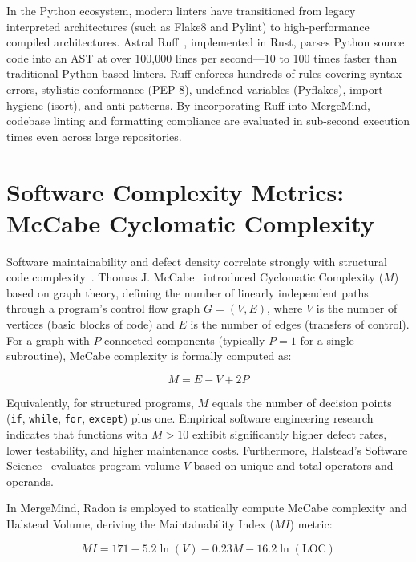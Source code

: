 In the Python ecosystem, modern linters have transitioned from legacy interpreted architectures (such as Flake8 and Pylint) to high-performance compiled architectures. Astral Ruff~\cite{astral2024ruff}, implemented in Rust, parses Python source code into an AST at over 100,000 lines per second---10 to 100 times faster than traditional Python-based linters. Ruff enforces hundreds of rules covering syntax errors, stylistic conformance (PEP 8), undefined variables (Pyflakes), import hygiene (isort), and anti-patterns. By incorporating Ruff into MergeMind, codebase linting and formatting compliance are evaluated in sub-second execution times even across large repositories.

\section{Software Complexity Metrics: McCabe Cyclomatic Complexity}
\label{sec:lit-mccabe}

Software maintainability and defect density correlate strongly with structural code complexity~\cite{bernardi2019using}. Thomas J. McCabe~\cite{mccabe1976complexity} introduced Cyclomatic Complexity ($M$) based on graph theory, defining the number of linearly independent paths through a program's control flow graph $G = (V, E)$, where $V$ is the number of vertices (basic blocks of code) and $E$ is the number of edges (transfers of control). For a graph with $P$ connected components (typically $P = 1$ for a single subroutine), McCabe complexity is formally computed as:

\begin{equation}
M = E - V + 2P
\label{eq:mccabe}
\end{equation}

Equivalently, for structured programs, $M$ equals the number of decision points (\texttt{if}, \texttt{while}, \texttt{for}, \texttt{except}) plus one. Empirical software engineering research indicates that functions with $M > 10$ exhibit significantly higher defect rates, lower testability, and higher maintenance costs. Furthermore, Halstead's Software Science~\cite{halstead1977elements} evaluates program volume $V$ based on unique and total operators and operands. 

In MergeMind, Radon is employed to statically compute McCabe complexity and Halstead Volume, deriving the Maintainability Index ($MI$) metric:

\begin{equation}
MI = 171 - 5.2 \ln(V) - 0.23 M - 16.2 \ln(\text{LOC})
\label{eq:maintainability-index}
\end{equation}

